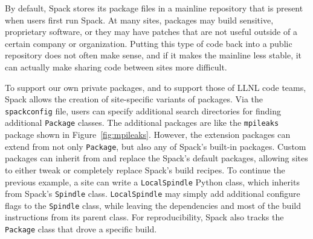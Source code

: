 By default, Spack stores its package files in a mainline repository that is present when users
first run Spack.  At many sites, packages may build sensitive, proprietary software, or they 
may have patches that are not useful outside of a certain company or organization.  Putting
this type of code back into a public repository does not often make sense, and if it makes the
mainline less stable, it can actually make sharing code between sites more difficult.  

To support our own private packages, and to support those of LLNL code teams, Spack allows the creation of site-specific variants of packages.  Via the {\tt spackconfig} file, users can specify additional search directories for finding additional {\tt Package} classes.
%
The additional packages are like the {\tt mpileaks} package shown in Figure~\ref{fig:mpileaks}.  However, the extension packages can extend from not only {\tt Package}, but also any of Spack's built-in packages.   Custom packages can inherit from and replace the Spack's default packages, allowing sites to either tweak or completely replace Spack's build recipes.  To continue the previous example, a site can write a {\tt LocalSpindle} Python class, which inherits from Spack's {\tt Spindle} class.  {\tt LocalSpindle} may simply add additional configure flags to the {\tt Spindle} class, while leaving the dependencies and most of the build instructions from its parent class.  For reproducibility, Spack also tracks the {\tt Package} class that drove a specific build. 






